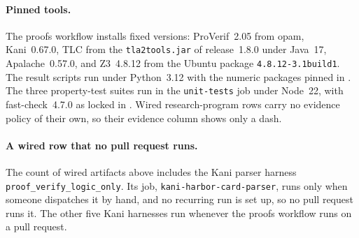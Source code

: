 {\raggedbottom
\setlength{\LTpre}{0pt}\setlength{\LTpost}{0pt}
\par}

\paragraph{Pinned tools.} The proofs workflow installs fixed versions:
ProVerif~2.05 from opam, Kani~0.67.0, TLC from the \texttt{tla2tools.jar} of
release~1.8.0 under Java~17, Apalache~0.57.0, and Z3~4.8.12 from the Ubuntu
package \texttt{4.8.12-3.1build1}. The result scripts run under Python~3.12
with the numeric packages pinned in
. The three property-test
suites run in the \texttt{unit-tests} job under Node~22, with fast-check~4.7.0
as locked in . Wired research-program rows carry no
evidence policy of their own, so their evidence column shows only a dash.

\paragraph{A wired row that no pull request runs.} The count of wired artifacts
above includes the Kani parser harness \texttt{proof\_verify\_logic\_only}. Its
job, \texttt{kani-harbor-card-parser}, runs only when someone dispatches it by
hand, and no recurring run is set up, so no pull request runs it. The other
five Kani harnesses run whenever the proofs workflow runs on a pull request.


